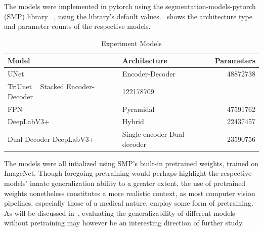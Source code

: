The models were implemented in pytorch using the segmentation-models-pytorch (SMP) library ~\cite{smp}, using the library's default values.~ shows the architecture type and parameter counts of the respective models. 
  \begin{table}[htb]
            \centering
            \begin{tabularx}{\linewidth}{lXr}
            \toprule
                 Model & Architecture & Parameters  \\
            \midrule
                 UNet ~\cite{unet} & Encoder-Decoder & 48872738\\ 
                 TriUnet ~\cite{divergentnets}
                 Stacked Encoder-Decoder & 122178709\\
                 FPN ~\cite{fpn} & Pyramidal & 47591762\\ 
                 DeepLabV3+ ~\cite{deeplab} & Hybrid & 22437457\\ 
                 Dual Decoder DeepLabV3+& Single-encoder Dual-decoder & 23590756\\
            \bottomrule
            \end{tabularx}
            \caption{Experiment Models}
            \label{tab:baselines}
        \end{table}
The models were all intialized using SMP's built-in pretrained weights, trained on ImageNet. Though foregoing pretraining would perhaps highlight the respective models' innate generalization ability to a greater extent, the use of pretrained weights nonetheless constitutes a more realistic context, as most computer vision pipelines, especially those of a medical nature, employ some form of pretraining. As will be discussed in~, evaluating the generalizability of different models without pretraining may however be an interesting direction of further study. 
 

